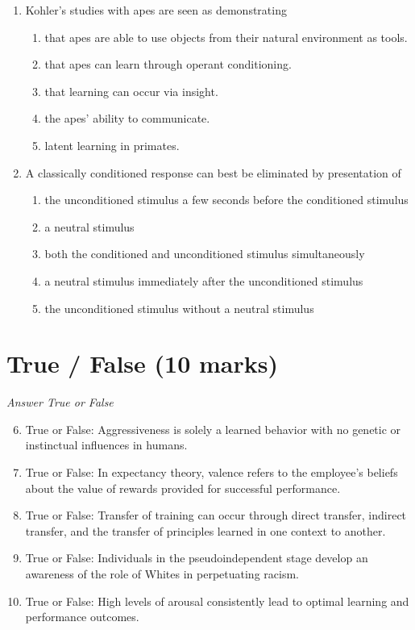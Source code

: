 \documentclass[12pt]{article}
\begin{document}
\begin{enumerate}[label=\arabic*.]
\begin{enumerate}[label=(\alph*)]
    \item the gender of the child.
\end{enumerate}
\item Kohler's studies with apes are seen as demonstrating
\begin{enumerate}[label=(\alph*)]
    \item that apes are able to use objects from their natural environment as tools.
    \item that apes can learn through operant conditioning.
    \item that learning can occur via insight.
    \item the apes' ability to communicate.
    \item latent learning in primates.
\end{enumerate}
\item A classically conditioned response can best be eliminated by presentation of
\begin{enumerate}[label=(\alph*)]
    \item the unconditioned stimulus a few seconds before the conditioned stimulus
    \item a neutral stimulus
    \item both the conditioned and unconditioned stimulus simultaneously
    \item a neutral stimulus immediately after the unconditioned stimulus
    \item the unconditioned stimulus without a neutral stimulus
\end{enumerate}
\end{enumerate}

\section*{True / False (10 marks)}
\textit{Answer True or False}
\begin{enumerate}[label=\arabic*.]
\setcounter{enumi}{5}
\item True or False: Aggressiveness is solely a learned behavior with no genetic or instinctual influences in humans.
\item True or False: In expectancy theory, valence refers to the employee's beliefs about the value of rewards provided for successful performance.
\item True or False: Transfer of training can occur through direct transfer, indirect transfer, and the transfer of principles learned in one context to another.
\item True or False: Individuals in the pseudoindependent stage develop an awareness of the role of Whites in perpetuating racism.
\item True or False: High levels of arousal consistently lead to optimal learning and performance outcomes.
\end{enumerate}
\end{document}
